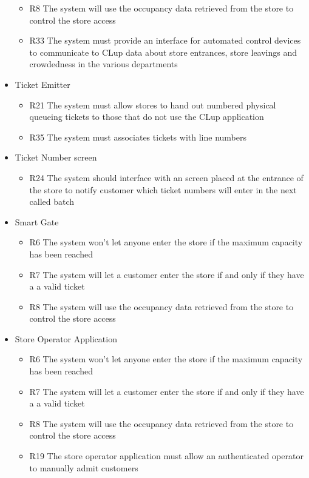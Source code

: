 \begin{itemize}
    \begin{itemize}
        \item R8 The system will use the occupancy data retrieved from the store to control the store access
        \item R33 The system must provide an interface for automated control devices to communicate to CLup data about store entrances, store leavings and crowdedness in the various departments
    \end{itemize}
    \item Ticket Emitter
    \begin{itemize}
        \item R21 The system must allow stores to hand out numbered physical queueing tickets to those that do not use the CLup application
        \item R35 The system must associates tickets with line numbers
    \end{itemize}
    \item Ticket Number screen
    \begin{itemize}
        \item R24 The system should interface with an screen placed at the entrance of the store to notify customer which ticket numbers will enter in the next called batch
    \end{itemize}
    \item Smart Gate
    \begin{itemize}
        \item R6 The system won’t let anyone enter the store if the maximum capacity has been reached
        \item R7 The system will let a customer enter the store if and only if they have a a valid ticket
        \item R8 The system will use the occupancy data retrieved from the store to control the store access
    \end{itemize}
    \item Store Operator Application
    \begin{itemize}
        \item R6 The system won’t let anyone enter the store if the maximum capacity has been reached
        \item R7 The system will let a customer enter the store if and only if they have a a valid ticket
        \item R8 The system will use the occupancy data retrieved from the store to control the store access
        \item R19 The store operator application must allow an authenticated operator to manually admit customers

\end{itemize}
\end{itemize}
